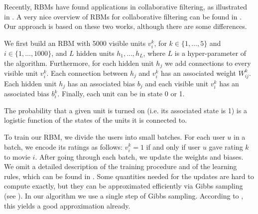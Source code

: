 \documentclass[10pt,conference,compsocconf]{IEEEtran}
\begin{document}
	Recently, RBMs have found applications in collaborative filtering, as illustrated in \cite{SMH07}. A very nice overview of RBMs for collaborative filtering can be found in \cite{L10}. Our approach is based on these two works, although there are some differences.
	
	We first build an RBM with 5000 visible units $v^k_i$, for $k\in\{1,\dots,5\}$ and $i\in\{1,\dots,1000\}$, and $L$ hidden units $h_1,\dots, h_L$, where $L$ is a hyper-parameter of the algorithm. Furthermore, for each hidden unit $h_j$ we add connections to every visible unit $v^k_i$. Each connection between $h_j$ and $v^k_i$ has an associated weight $W^k_{ij}$. Each hidden unit $h_j$ has an associated bias $b_j$ and each visible unit $v^k_i$ has an associated bias $b^k_i$. Finally, each unit can be in state 0 or 1.
	
	The probability that a given unit is turned on (i.e. its associated state is 1) is a logistic function of the states of the units it is connected to. 
	
	
	To train our RBM, we divide the users into small batches. For each user $u$ in a batch, we encode its ratings as follows: $v^k_i=1$ if and only if user $u$ gave rating $k$ to movie $i$. After going through each batch, we update the weights and biases. We omit a detailed description of the training procedure and of the learning rules, which can be found in \cite{L10}. Some quantities needed for the updates are hard to compute exactly, but they can be approximated efficiently via Gibbs sampling (see \cite{H02}). In our algorithm we use a single step of Gibbs sampling. According to \cite{L10}, this yields a good approximation already.
	
%	
	
\end{document}
